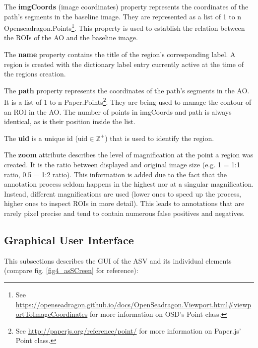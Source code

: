 The \textbf{imgCoords} (image coordinates) property represents the coordinates of the path's segments in the baseline image. They are represented as a list of 1 to n Openseadragon.Points\footnote{
	See \url{https://openseadragon.github.io/docs/OpenSeadragon.Viewport.html\#viewportToImageCoordinates} for more information on OSD's Point class.
}. This property is used to establish the relation between the ROIs of the AO and the baseline image.

The \textbf{name} property contains the title of the region's corresponding label. A region is created with the dictionary label entry currently active at the time of the regions creation.

The \textbf{path} property represents the coordinates of the path's segments in the AO. It is a list of 1 to n Paper.Points\footnote{
	See \url{http://paperjs.org/reference/point/} for more information on Paper.js' Point class.
}. They are being used to manage the contour of an ROI in the AO. The number of points in imgCoords and path is always identical, as is their position inside the list.

The \textbf{uid} is a unique id ($\text{uid} \in \mathbb{Z}^{+}$) that is used to identify the region.

The \textbf{zoom} attribute describes the level of magnification at the point a region was created. It is the ratio between displayed and original image size (e.g. 1 = 1:1 ratio, 0.5 = 1:2 ratio). This information is added due to the fact that the annotation process seldom happens in the highest nor at a singular magnification. Instead, different magnifications are used (lower ones to speed up the process, higher ones to inspect ROIs in more detail). This leads to annotations that are rarely pixel precise and tend to contain numerous false positives and negatives\cite{Janowczyk16}.


\subsection{Graphical User Interface}
This subsections describes the GUI of the ASV and its individual elements (compare fig. \ref{fig4_asSCreen} for reference):

